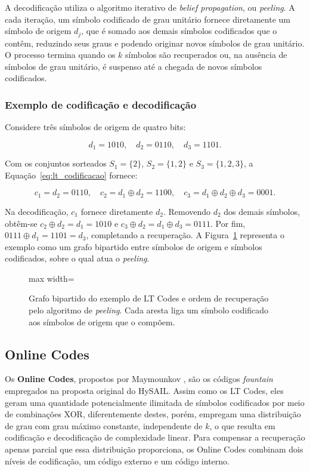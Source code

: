 A decodificação utiliza o algoritmo iterativo de \emph{belief propagation}, ou \emph{peeling}. A cada iteração, um símbolo codificado de grau unitário fornece diretamente um símbolo de origem $d_j$, que é somado aos demais símbolos codificados que o contêm, reduzindo seus graus e podendo originar novos símbolos de grau unitário. O processo termina quando os $k$ símbolos são recuperados ou, na ausência de símbolos de grau unitário, é suspenso até a chegada de novos símbolos codificados.

\subsubsection{Exemplo de codificação e decodificação}%
Considere três símbolos de origem de quatro bits:

\begin{equation}
	d_1 = 1010, \quad d_2 = 0110, \quad d_3 = 1101.
\end{equation}

Com os conjuntos sorteados $S_1 = \{2\}$, $S_2 = \{1, 2\}$ e $S_3 = \{1, 2, 3\}$, a Equação~\eqref{eq:lt_codificacao} fornece:

\begin{equation}
	c_1 = d_2 = 0110, \quad
	c_2 = d_1 \oplus d_2 = 1100, \quad
	c_3 = d_1 \oplus d_2 \oplus d_3 = 0001.
\end{equation}

Na decodificação, $c_1$ fornece diretamente $d_2$. Removendo $d_2$ dos demais símbolos, obtêm-se $c_2 \oplus d_2 = d_1 = 1010$ e $c_3 \oplus d_2 = d_1 \oplus d_3 = 0111$. Por fim, $0111 \oplus d_1 = 1101 = d_3$, completando a recuperação. A Figura~\ref{fig:lt_grafo} representa o exemplo como um grafo bipartido entre símbolos de origem e símbolos codificados, sobre o qual atua o \emph{peeling}.

\begin{figure}[htbp]
	\centering
	\begin{adjustbox}{max width=\textwidth}
		
	\end{adjustbox}
	\caption{Grafo bipartido do exemplo de LT Codes e ordem de recuperação pelo algoritmo de \emph{peeling}. Cada aresta liga um símbolo codificado aos símbolos de origem que o compõem.}
	\label{fig:lt_grafo}
\end{figure}

\subsection{Online Codes}
\label{sec:fundamentacao_online}
Os \textbf{Online Codes}, propostos por Maymounkov \cite{maymounkov2002online,maymounkov2003rateless}, são os códigos \emph{fountain} empregados na proposta original do HySAIL. Assim como os LT Codes, eles geram uma quantidade potencialmente ilimitada de símbolos codificados por meio de combinações XOR, diferentemente destes, porém, empregam uma distribuição de grau com grau máximo constante, independente de $k$, o que resulta em codificação e decodificação de complexidade linear. Para compensar a recuperação apenas parcial que essa distribuição proporciona, os Online Codes combinam dois níveis de codificação, um código externo e um código interno.

